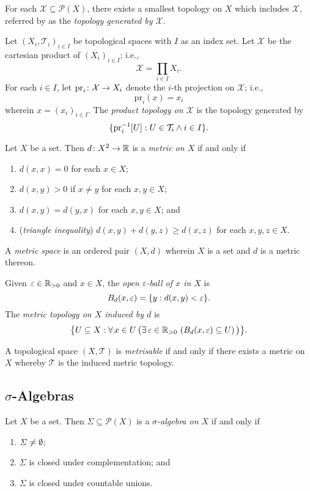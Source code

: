 For each \(\mathcal{X} \subseteq \mathcal{P}(X)\), there exists a smallest topology on \(X\) which includes
\(\mathcal{X}\), referred by as the \emph{topology generated by \(\mathcal{X}\)}.

Let \((X_i, \mathcal{T}_i)_{i \in I}\) be topological spaces with \(I\) as an index set. Let \(\mathcal{X}\) be the
cartesian product of \((X_i)_{i \in I}\); i.e.,
\[
  \mathcal{X} = \prod_{i \in I} X_i.
\]
For each \(i \in I\), let \(\text{pr}_i\colon\mathcal{X}\to X_i\) denote the \(i\)-th projection on \(\mathcal{X}\);
i.e.,
\[
  \text{pr}_i(x) = x_i
\]
wherein \(x = (x_i)_{i \in I}\). The \emph{product topology on \(\mathcal{X}\)} is the topology generated by
\[
  \{\text{pr}_i^{-1}[U] : U \in \mathcal{T}_i \land i \in I\}.
\]

\Bdf
  Let \(X\) be a set. Then \(d\colon X^2\to\mathbb{R}\) is a \emph{metric on \(X\)} if and only if
  \begin{enumerate}
    \item \(d(x, x) = 0\) for each \(x \in X\);
    \item \(d(x, y) > 0\) if \(x \ne y\) for each \(x, y \in X\);
    \item \(d(x, y) = d(y, x)\) for each \(x, y \in X\); and
    \item (\emph{triangle inequality}) \(d(x, y) + d(y, z) \ge d(x, z)\) for each \(x, y, z \in X\).
  \end{enumerate}

  A \emph{metric space} is an ordered pair \((X, d)\) wherein \(X\) is a set and \(d\) is a metric thereon.
\Edf

Given \(\varepsilon \in \mathbb{R}_{>0}\) and \(x \in X\), the \emph{open \(\varepsilon\)-ball of \(x\) in \(X\)} is
\[
  B_d(x, \varepsilon) = \{y : d(x, y) < \varepsilon\}.
\]
The \emph{metric topology on \(X\) induced by \(d\)} is
\[
  \set*{U \subseteq X : \forall \, x \in U \, \big(\exists \, \varepsilon \in \posreal \, \left(B_d(x, \varepsilon)
  \subseteq U\right)\big)}.
\]

A topological space \((X, \mathcal{T})\) is \emph{metrisable} if and only if there exists a metric on \(X\) whereby
\(\mathcal{T}\) is the induced metric topology.

\subsection{\texorpdfstring{\(\sigma\)}{Sigma}-Algebras}

\Bdf
  Let \(X\) be a set. Then \(\varSigma \subseteq \mathcal{P}(X)\) is a \emph{\(\sigma\)-algebra on \(X\)} if and only if
  \begin{enumerate}
    \item \(\varSigma \ne \emptyset\);
    \item \(\varSigma\) is closed under complementation; and
    \item \(\varSigma\) is closed under countable unions.
  \end{enumerate}

